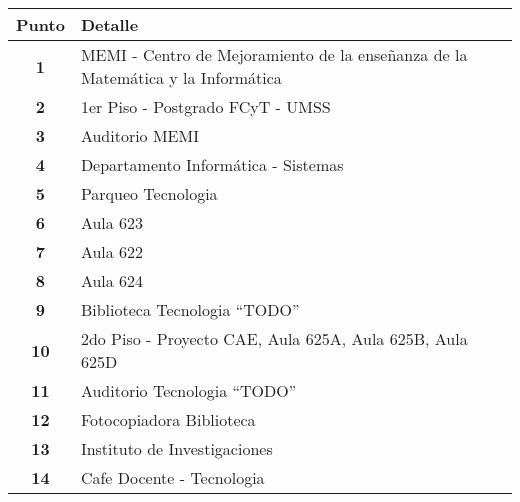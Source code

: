 \begin{table}[H]
  \begin{center}
    \begin{tabularx}{\textwidth}{ c  X }
      \toprule
        \textbf{Punto} &
        \textbf{Detalle}\\

      \midrule
        \textbf{1}
        &
        MEMI - Centro  de Mejoramiento de la enseñanza  de la Matemática y la Informática
        \\

      \addlinespace
      \textbf{2}
      &
        1{\tiny er} Piso - Postgrado FCyT - UMSS
      \\

      \addlinespace
      \textbf{3}
      &
      Auditorio MEMI
      \\

      \addlinespace
      \textbf{4}
      &
      Departamento Informática - Sistemas
      \\

      \addlinespace
      \textbf{5}
      &
      Parqueo Tecnologia
      \\

      \addlinespace
      \textbf{6}
      &
      Aula 623
      \\


      \addlinespace
      \textbf{7}
      &
      Aula 622
      \\

      \addlinespace
      \textbf{8}
      &
      Aula 624
      \\

      \addlinespace
      \textbf{9}
      &
      Biblioteca Tecnologia ``TODO''
      \\

      \addlinespace
      \textbf{10}
      &
      2{\tiny do} Piso - Proyecto CAE, Aula 625A, Aula 625B, Aula 625D
      \\

      \addlinespace
      \textbf{11}
      &
      Auditorio Tecnologia ``TODO''
      \\

      \addlinespace
      \textbf{12}
      &
      Fotocopiadora Biblioteca
      \\

      \addlinespace
      \textbf{13}
      &
      Instituto de Investigaciones
      \\


      \addlinespace
      \textbf{14}
      &
      Cafe Docente - Tecnologia
      \\


\end{tabularx}
\end{center}
\end{table}

